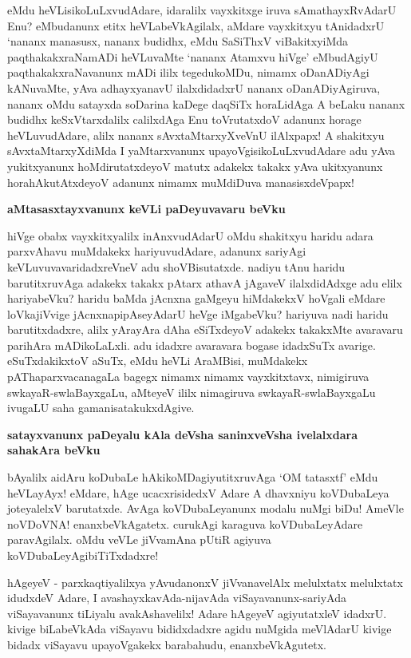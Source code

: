 \noindent
eMdu heVLisikoLuLxvudAdare, idaralilx vayxkitxge iruva sAmathayxRvAdarU 
Enu? eMbudanunx etitx\- heVLabeVkAgilalx, aMdare vayxkitxyu tAnidadxrU 
`nananx manasusx, nananx budidhx, eMdu SaSiThxV viBakitx\-yiMda 
paqthakakxraNamADi heVLuvaMte `nananx Atamxvu hiVge' eMbudAgiyU 
paqthakakxraNavanunx mADi ililx tegedu\-koMDu, nimamx oDanADiyAgi 
kANuvaMte, yAva adhayxyanavU ilalxdidadxrU nananx oDanADiyAgi\-ruva, 
nananx oMdu satayxda soDarina kaDege daqSiTx horaLidAga A beLaku nananx budidhx keSxVtarxdalilx calilxdAga Enu toVrutatxdoV adanunx horage heVLuvudAdare, alilx nananx sAvxtaMtarxyXveVnU ilAlxpapx! A shakitxyu sAvxtaMtarxyX\-diMda I yaMtarxvanunx upayoVgisikoLuLxvudAdare adu yAva yukitxyanunx hoMdiru\-tatxdeyoV matutx adakekx takakx yAva ukitxyanunx horahAkutAtxdeyoV adanunx nimamx muMdiDuva mana\-sisxdeVpapx!

{\bigskip
\noindent
{\large\bf aMtasasxtayxvanunx keVLi paDeyuvavaru beVku}}\label{page108}
\medskip

\noindent
hiVge obabx vayxkitxyalilx inAnxvudAdarU oMdu shakitxyu haridu adara 
parxvAhavu muMdakekx hariyuvu\-dAdare, adanunx sariyAgi keVLuvuvavaridadxreVneV adu shoVBisutatxde. nadiyu tAnu haridu baru\-titxru\-vAga adakekx takakx pAtarx athavA jAgaveV ilalxdidAdxge adu elilx hariyabeVku? haridu baMda jAcnxna gaMgeyu hiMdakekxV hoVgali eMdare loVkajiVvige jAcnxnapipAseyAdarU heVge iMgabeVku? hariyuva nadi haridu barutitxdadxre, alilx yArayAra dAha eSiTxdeyoV adakekx takakxMte avaravaru parihAra mADi\-koLaLxli. adu idadxre avaravara bogase idadxSuTx avarige. eSuTxdakikxtoV aSuTx, eMdu heVLi AraMBisi, muMdakekx pAThaparxvacanagaLa bagegx nimamx nimamx vayxkitxtavx, nimigiruva swkayaR-swlaBayxgaLu, aMteyeV ililx nimagiruva swkayaR-swlaBayxgaLu ivugaLU saha gamanisatakukxdAgive.

{\bigskip
\noindent
{\large\bf satayxvanunx paDeyalu kAla deVsha saninxveVsha ivelalxdara sahakAra beVku}}\label{page109}
\medskip

\noindent
bAyalilx aidAru koDubaLe hAkikoMDagiyutitxruvAga `OM tatasxtf' eMdu heVLayAyx! eMdare, hAge ucacxrisidedxV Adare A dhavxniyu koVDubaLeya joteyalelxV barutatxde. AvAga koVDubaLeyanunx modalu nuMgi biDu! AmeVle noVDoVNA! enanxbeVkAgatetx. curukAgi karaguva koVDubaLeyAdare paravAgilalx. oMdu veVLe jiVvamAna pUtiR agiyuva koVDubaLeyAgibiTiTxdadxre!

hAgeyeV - parxkaqtiyalilxya yAvudanonxV jiVvanavelAlx melulxtatx 
melulxtatx idudxdeV Adare, I avashayxka\-vAda-nijavAda 
viSaya\-vanunx-sariyAda viSaya\-vanunx tiLiyalu avakAshavelilx! Adare 
hAgeyeV agi\-yu\-tatxleV idadxrU. kivige biLa\-beVkAda viSayavu bididxdadxre 
agidu nuMgida meVlAdarU kivige bidadx viSayavu upayoVgakekx barabahudu, enanxbeVkAgutetx.

